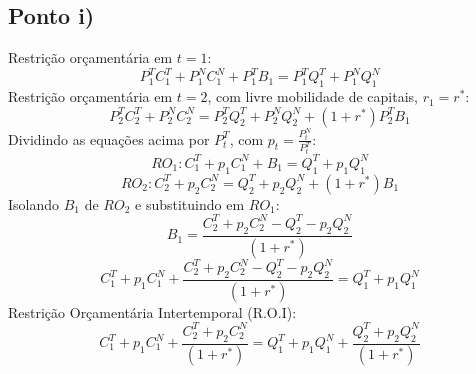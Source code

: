 \documentclass{article}
\begin{document}
\subsection*{Ponto i)}
Restrição orçamentária em $t=1$:
\begin{equation*}
    P_1^T C_1^T + P_1^N C_1^N + P_1^T B_1 = P_1^T Q_1^T + P_1^N Q_1^N
\end{equation*}
Restrição orçamentária em $t=2$, com livre mobilidade de capitais, $r_1=r^*$:
\begin{equation*}
    P_2^T C_2^T + P_2^N C_2^N = P_2^T Q_2^T + P_2^N Q_2^N + (1+r^*)P_2^T B_1
\end{equation*}
Dividindo as equações acima por $P_t^T$, com $p_t=\frac{P_t^N}{P_t^T}$:
\begin{equation*}
    RO_1: C_1^T + p_1 C_1^N + B_1 = Q_1^T + p_1 Q_1^N
\end{equation*}
\begin{equation*}
    RO_2: C_2^T + p_2 C_2^N = Q_2^T + p_2 Q_2^N + (1+r^*)B_1
\end{equation*}
Isolando $B_1$ de $RO_2$ e substituindo em $RO_1$:
\begin{equation*}
    B_1 = \frac{C_2^T + p_2 C_2^N - Q_2^T - p_2 Q_2^N}{(1+r^*)}
\end{equation*}
\begin{equation*}
     C_1^T + p_1 C_1^N + \frac{C_2^T + p_2 C_2^N - Q_2^T - p_2 Q_2^N}{(1+r^*)} = Q_1^T + p_1 Q_1^N
\end{equation*}
Restrição Orçamentária Intertemporal (R.O.I):
\begin{equation}\label{eq:roi}
     C_1^T + p_1 C_1^N + \frac{C_2^T + p_2 C_2^N}{(1+r^*)} = Q_1^T + p_1 Q_1^N + \frac{Q_2^T + p_2 Q_2^N}{(1+r^*)}
\end{equation}
\end{document}
